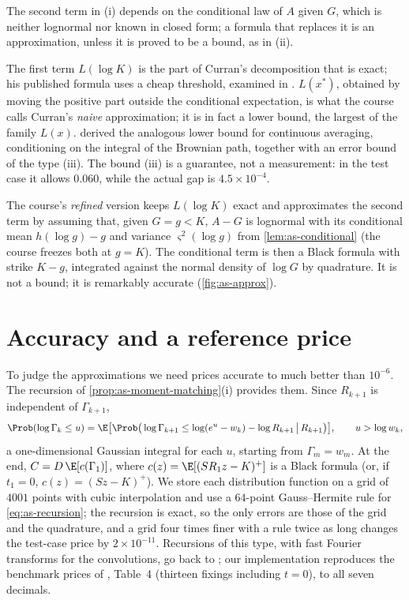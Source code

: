 The second term in (i) depends on the conditional law of $A$ given $G$, which is neither
lognormal nor known in closed form; a formula that replaces it is an approximation, unless it
is proved to be a bound, as in (ii).

The first term $L(\log K)$ is the part of Curran's decomposition that is exact; his
published formula uses a cheap threshold, examined in .
$L(x^*)$, obtained by moving the positive part outside the conditional expectation, is what the
course calls Curran's \emph{naive} approximation; it is in fact a lower bound, the largest of the
family $L(x)$. \textcite{rogers-shi} derived the analogous lower bound for continuous averaging,
conditioning on the integral of the Brownian path, together with an error bound of the type
(iii). The bound (iii) is a guarantee, not a measurement: in the test case it allows
$0.060$, while the actual gap is $4.5\times10^{-4}$.

The course's \emph{refined} version keeps $L(\log K)$ exact and approximates the second term
by assuming that, given $G=g<K$, $A-G$ is lognormal with its conditional mean $h(\log g)-g$
and variance $\varsigma^2(\log g)$ from \cref{lem:as-conditional} (the course freezes both at
$g=K$).
The conditional term is then a Black formula with strike $K-g$, integrated against the normal
density of $\log G$ by quadrature. It is not a bound; it is remarkably accurate
(\cref{fig:as-approx}).

\section{Accuracy and a reference price}\label{sec:as-reference}

To judge the approximations we need prices accurate to much better than $10^{-6}$. The
recursion of \cref{prop:as-moment-matching}(i) provides them. Since $R_{k+1}$ is independent of
$\Gamma_{k+1}$,
\begin{equation}\label{eq:as-recursion}
  \Prob(\log\Gamma_k\le u)=\E\big[\Prob\big(\log\Gamma_{k+1}\le\log(e^u-w_k)-\log R_{k+1}\,\big|\,R_{k+1}\big)\big],
  \qquad u>\log w_k,
\end{equation}
a one-dimensional Gaussian integral for each $u$, starting from $\Gamma_m=w_m$. At the end,
$C=D\,\E[c(\Gamma_1)]$, where $c(z)=\E[(SR_1z-K)^+]$ is a Black formula (or, if $t_1=0$,
$c(z)=(Sz-K)^+$). We store each distribution function on a grid of $4001$ points with cubic
interpolation and use a $64$-point Gauss--Hermite rule for \eqref{eq:as-recursion}; the
recursion is exact, so the only errors are those of the grid and the quadrature, and a grid four
times finer with a rule twice as long changes the test-case price by $2\times10^{-11}$. Recursions of this type, with fast Fourier
transforms for the convolutions, go back to \textcite{carverhill-clewlow}; our implementation
reproduces the benchmark prices of \textcite{cerny-kyriakou}, Table~4 (thirteen fixings
including $t=0$), to all seven decimals.

